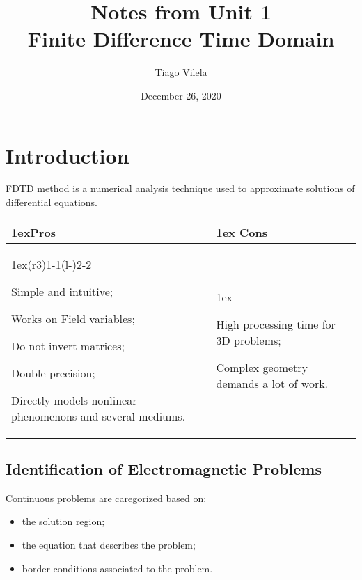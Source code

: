 \documentclass[12pt]{article}
\title{\textbf{Notes from Unit 1 \\ Finite Difference Time Domain}}
\author{Tiago Vilela}
\date{December 26, 2020}
\begin{document}
\maketitle
\section{Introduction}%
\label{sec:introduction}

\acrfull{FDTD} method is a numerical analysis technique used to approximate solutions of differential equations.


\begin{table}[htpb]
	\begin{tabularx}
		{\linewidth}{>{\parskip1ex}X@{\kern4\tabcolsep}>{\parskip1ex}X}
		\toprule
		\hfil\bfseries Pros
		 &
		\hfil\bfseries Cons
		\\\cmidrule(r{3\tabcolsep}){1-1}\cmidrule(l{-\tabcolsep}){2-2}

		Simple and intuitive;                  \par
		Works on Field variables; \par
		Do not invert matrices;                \par
		Double precision;                      \par
		Directly models nonlinear phenomenons and several mediums. \par

		 &

		High processing time for 3D problems; \par
		Complex geometry demands a lot of work. \par

		\\\bottomrule
	\end{tabularx}
\end{table}

\subsection{Identification of Electromagnetic Problems}%
\label{sec:identification_of_electromagnetic_problems}
Continuous problems are caregorized based on:
\begin{itemize}
	\item the solution region;
	\item the equation that describes the problem;
	\item border conditions associated to the problem.
\end{itemize}
\end{document}
